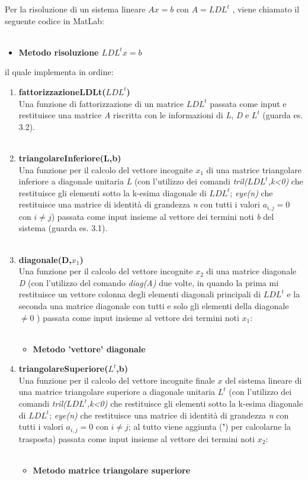 Per la risoluzione di un sistema lineare $Ax=b$ con $A=LDL^t$ , viene chiamato il seguente codice in MatLab:\\\
\begin{itemize}
\item \textbf{Metodo risoluzione $LDL^tx=b$}

\end{itemize}
il quale implementa in ordine:
\begin{enumerate}
\item \textbf{fattorizzazioneLDLt($LDL^t$)}\\
Una funzione di fattorizzazione di un matrice $LDL^t$ passata come input e restituisce una matrice \textit{A} riscritta con le informazioni di \textit{L}, \textit{D} e $L^t$ (guarda es. 3.2).\\\
\item \textbf{triangolareInferiore(L,b)}\\
Una funzione per il calcolo del vettore incognite $x_1$ di una matrice triangolare inferiore a diagonale unitaria \textit{L} (con l'utilizzo dei comandi \textit{tril($LDL^t$,k<0)} che restituisce gli elementi sotto la k-esima diagonale di $LDL^t$; \textit{eye(n)} che restituisce una matrice di identità di grandezza \textit{n} con tutti i valori $a_{i,j}=0$ con $i \neq j$) passata come input insieme al vettore dei termini noti \textit{b} del sistema (guarda es. 3.1). \\\
\item \textbf{diagonale(D,$x_1$)}\\
Una funzione per il calcolo del vettore incognite $x_2$ di una matrice diagonale \textit{D} (con l'utilizzo del comando \textit{diag(A)} due volte, in quando la prima mi restituisce un vettore colonna degli elementi diagonali principali di $LDL^t$ e la seconda una matrice diagonale con tutti e solo gli elementi della diagonale $\neq 0$ ) passata come input insieme al vettore dei termini noti $x_1$:\\\
\begin{itemize}
\item \textbf{Metodo 'vettore' diagonale}

\end{itemize}
\item \textbf{triangolareSuperiore($L^t$,b)}\\
Una funzione per il calcolo del vettore incognite finale $x$ del sistema lineare di una matrice triangolare superiore a diagonale unitaria \textit{$L^t$} (con l'utilizzo dei comandi \textit{tril($LDL^t$,k<0)} che restituisce gli elementi sotto la k-esima diagonale di $LDL^t$; \textit{eye(n)} che restituisce una matrice di identità di grandezza \textit{n} con tutti i valori $a_{i,j}=0$ con $i \neq j$; al tutto viene aggiunta (\textbf{'}) per calcolarne la trasposta) passata come input insieme al vettore dei termini noti $x_2$:\\\
\begin{itemize}
\item \textbf{Metodo matrice triangolare superiore}

\end{itemize}
\end{enumerate}